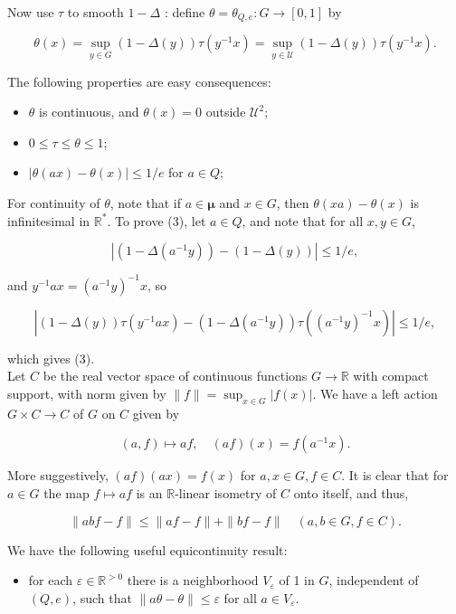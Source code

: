 \documentclass[10pt]{article}
\begin{document}
Now use $\tau$ to smooth $1-\Delta$ : define $\theta=\theta_{Q, e}: G \rightarrow[0,1]$ by

$$
\theta(x)=\sup _{y \in G}(1-\Delta(y)) \tau\left(y^{-1} x\right)=\sup _{y \in \mathcal{U}}(1-\Delta(y)) \tau\left(y^{-1} x\right) .
$$

The following properties are easy consequences:

\begin{itemize}
  \item[(1)] $\theta$ is continuous, and $\theta(x)=0$ outside $\mathcal{U}^{2}$;
  \item[(2)] $0 \leq \tau \leq \theta \leq 1$;
  \item[(3)] $|\theta(a x)-\theta(x)| \leq 1 / e$ for $a \in Q$;
\end{itemize}

For continuity of $\theta$, note that if $a \in \boldsymbol{\mu}$ and $x \in G$, then $\theta(x a)-\theta(x)$ is infinitesimal in $\mathbb{R}^{*}$. To prove (3), let $a \in Q$, and note that for all $x, y \in G$,

$$
\left|\left(1-\Delta\left(a^{-1} y\right)\right)-(1-\Delta(y))\right| \leq 1 / e,
$$

and $y^{-1} a x=\left(a^{-1} y\right)^{-1} x$, so

$$
\left|(1-\Delta(y)) \tau\left(y^{-1} a x\right)-\left(1-\Delta\left(a^{-1} y\right)\right) \tau\left(\left(a^{-1} y\right)^{-1} x\right)\right| \leq 1 / e,
$$

which gives (3).\\
Let $C$ be the real vector space of continuous functions $G \rightarrow \mathbb{R}$ with compact support, with norm given by $\|f\|=\sup _{x \in G}|f(x)|$. We have a left action $G \times C \rightarrow C$ of $G$ on $C$ given by

$$
(a, f) \mapsto a f, \quad(a f)(x)=f\left(a^{-1} x\right) .
$$

More suggestively, $(a f)(a x)=f(x)$ for $a, x \in G, f \in C$. It is clear that for $a \in G$ the map $f \mapsto a f$ is an $\mathbb{R}$-linear isometry of $C$ onto itself, and thus,

$$
\|a b f-f\| \leq\|a f-f\|+\|b f-f\| \quad(a, b \in G, f \in C) .
$$

We have the following useful equicontinuity result:

\begin{itemize}
  \item[(4)] for each $\varepsilon \in \mathbb{R}^{>0}$ there is a neighborhood $V_{\varepsilon}$ of 1 in $G$, independent of $(Q, e)$, such that $\|a \theta-\theta\| \leq \varepsilon$ for all $a \in V_{\varepsilon}$.
\end{itemize}
\end{document}
